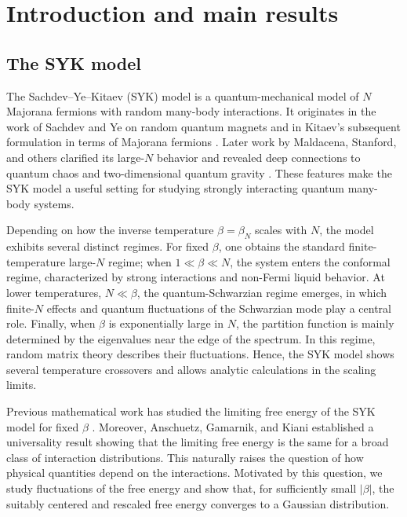 \documentclass[../CLT_SYK.tex]{subfiles}
\begin{document}
\section{Introduction and main results}
\label{sec:introduction}



\subsection{The SYK model}\label{subsec:SYK-model}
The Sachdev--Ye--Kitaev (SYK) model is a quantum-mechanical model of \(N\) Majorana fermions with random many-body interactions. It originates in the work of Sachdev and Ye on random quantum magnets \cite{SachdevYe1993} and in Kitaev’s subsequent formulation in terms of Majorana fermions \cite{Kitaev2015}. Later work by Maldacena, Stanford, and others clarified its large-\(N\) behavior and revealed deep connections to quantum chaos and two-dimensional quantum gravity \cite{MaldacenaStanford2016}. These features make the SYK model a useful setting for studying strongly interacting quantum many-body systems.

Depending on how the inverse temperature \(\beta=\beta_N\) scales with \(N\), the model exhibits several distinct regimes. For fixed \(\beta\), one obtains the standard finite-temperature large-\(N\) regime; when \(1\ll \beta\ll N\), the system enters the conformal regime, characterized by strong interactions and non-Fermi liquid behavior. At lower temperatures, \(N\ll \beta\), the quantum-Schwarzian regime emerges, in which finite-\(N\) effects and quantum fluctuations of the Schwarzian mode play a central role. Finally, when \(\beta\) is exponentially large in \(N\), the partition function is mainly determined by the eigenvalues near the edge of the spectrum. In this regime, random matrix theory  describes their fluctuations. Hence, the SYK model shows several temperature crossovers and allows analytic calculations in the scaling limits.

Previous mathematical work has studied the limiting free energy of the SYK model for fixed $\beta$ \cite{GPSZ2026,He2026}. Moreover, Anschuetz, Gamarnik, and Kiani \cite{AGK2025} established a universality result showing that the limiting free energy is the same for a broad class of interaction distributions.  This naturally raises the question of how physical quantities depend on the interactions. Motivated by this question, we study fluctuations of the free energy and show that, for sufficiently small \(|\beta|\), the suitably centered and rescaled free energy converges to a Gaussian distribution.
\end{document}
